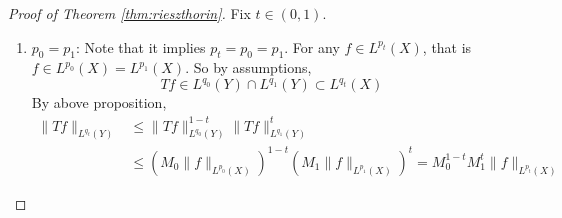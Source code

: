\begin{proof}[Proof of Theorem \ref{thm:rieszthorin}]
	Fix $t \in (0,1)$.
	\begin{enumerate}[label=(\Roman*)]
		\item $p_0 = p_1$: Note that it implies $p_t=p_0=p_1$. For any $f \in L^{p_t}(X)$, that is $f \in L^{p_0}(X) = L^{p_1}(X)$. So by assumptions,
		\begin{equation*}
			T f \in L^{q_0}(Y) \cap L^{q_1}(Y) \subset L^{q_t}(X)
		\end{equation*}
		By above proposition,
		\begin{equation*}
			\begin{aligned}
				\|T f\|_{L^{q_t}(Y)} & \leq\|T f\|_{L^{q_0}(Y)}^{1-t}\|T f\|_{L^{q_1}(Y)}^t \\
				& \leq\left(M_0\|f\|_{L^{p_0}(X)}\right)^{1-t}\left(M_1\|f\|_{L^{p_1}(X)}\right)^t=M_0^{1-t} M_1^t\|f\|_{L^{p_t}(X)}
			\end{aligned}
		\end{equation*}


\end{enumerate}
\end{proof}
